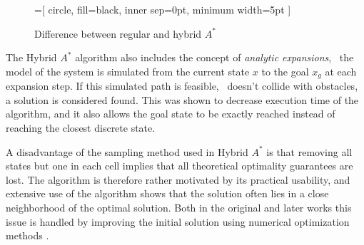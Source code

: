 \begin{figure}
    \begin{center}
        =[
            circle,
            fill=black,
            inner sep=0pt,
            minimum width=5pt
        ]
    \end{center}
    \caption{Difference between regular and hybrid $A^*$}
    \label{fig:hybrid_vs_regular}
\end{figure}

The Hybrid $A^*$ algorithm also includes the concept of \textit{analytic expansions}, \ie\ the
model of the system is simulated from the current state $x$ to the goal $x_g$ at each expansion step. If this simulated path is feasible,
\ie\  doesn't collide with obstacles, a solution is considered found. This was shown to decrease execution time of the algorithm,
and it also allows the goal state to be exactly reached instead of reaching the closest discrete state.

A disadvantage of the sampling method used in Hybrid $A^*$ is that removing all states but one in each cell implies 
that all theoretical optimality guarantees are lost. The algorithm is therefore rather motivated by its practical usability, and extensive use of the algorithm shows that 
the solution often lies in a close neighborhood of the optimal solution. Both in the original and later works this issue is handled 
by improving the initial solution using numerical optimization methods \cite{hybrid_astar} \cite{obstacle_optimization_hybrid}.


